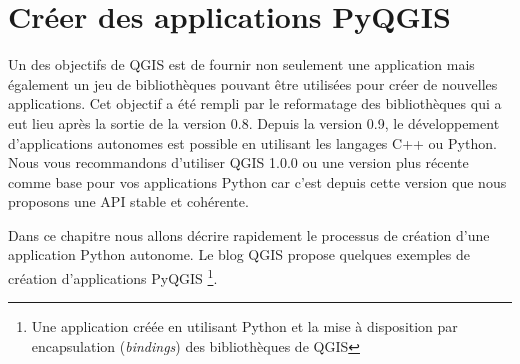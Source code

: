
\section{Cr\'eer des applications PyQGIS}


Un des objectifs de QGIS est de fournir non seulement une application mais \'egalement un jeu de biblioth\`eques pouvant \^etre utilis\'ees pour cr\'eer de nouvelles applications. Cet objectif a \'et\'e rempli par le reformatage des biblioth\`eques qui a eut lieu apr\`es la sortie de la version 0.8. Depuis la version 0.9, le d\'eveloppement d'applications autonomes est possible en utilisant les langages C++ ou Python. Nous vous recommandons d'utiliser QGIS 1.0.0 ou une version plus r\'ecente comme base pour vos applications Python car c'est depuis cette version que nous proposons une API stable et coh\'erente.

Dans ce chapitre nous allons d\'ecrire rapidement le processus de cr\'eation d'une application Python autonome. Le blog QGIS propose quelques exemples de cr\'eation d'applications PyQGIS \footnote{Une application cr\'e\'ee en utilisant Python et la mise \`a disposition par encapsulation (\textit{bindings}) des biblioth\`eques de QGIS}.

